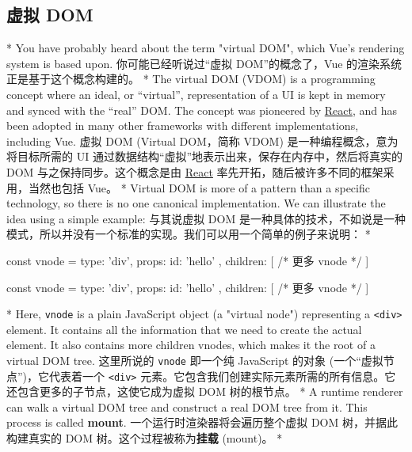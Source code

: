 \begin{paracol}{2}
\subsection{虚拟 DOM}
\switchcolumn[0]*%
You have probably heard about the term "virtual DOM", which Vue's
rendering system is based upon.
\switchcolumn
你可能已经听说过``虚拟 DOM''的概念了，Vue
的渲染系统正是基于这个概念构建的。
\switchcolumn[0]*%
The virtual DOM (VDOM) is a programming concept where an ideal, or
``virtual'', representation of a UI is kept in memory and synced with
the ``real'' DOM. The concept was pioneered by
\href{https://reactjs.org/}{React}, and has been adopted in many other
frameworks with different implementations, including Vue.
\switchcolumn
虚拟 DOM (Virtual DOM，简称 VDOM) 是一种编程概念，意为将目标所需的 UI
通过数据结构``虚拟''地表示出来，保存在内存中，然后将真实的 DOM
与之保持同步。这个概念是由 \href{https://reactjs.org/}{React}
率先开拓，随后被许多不同的框架采用，当然也包括 Vue。
\switchcolumn[0]*%
Virtual DOM is more of a pattern than a specific technology, so there is
no one canonical implementation. We can illustrate the idea using a
simple example:
\switchcolumn
与其说虚拟 DOM
是一种具体的技术，不如说是一种模式，所以并没有一个标准的实现。我们可以用一个简单的例子来说明：
\switchcolumn[0]*%
\begin{codeJs}
const vnode = {
  type: 'div',
  props: {
    id: 'hello'
  },
  children: [
    /* 更多 vnode */
  ]
}
\end{codeJs}
\switchcolumn
\begin{codeJs}
const vnode = {
  type: 'div',
  props: {
    id: 'hello'
  },
  children: [
    /* 更多 vnode */
  ]
}
\end{codeJs}
\switchcolumn[0]*%
Here, \texttt{vnode} is a plain JavaScript object (a "virtual node")
representing a \texttt{\textless{}div\textgreater{}} element. It
contains all the information that we need to create the actual element.
It also contains more children vnodes, which makes it the root of a
virtual DOM tree.
\switchcolumn
这里所说的 \texttt{vnode} 即一个纯 JavaScript 的对象
(一个``虚拟节点'')，它代表着一个 \texttt{\textless{}div\textgreater{}}
元素。它包含我们创建实际元素所需的所有信息。它还包含更多的子节点，这使它成为虚拟
DOM 树的根节点。
\switchcolumn[0]*%
A runtime renderer can walk a virtual DOM tree and construct a real DOM
tree from it. This process is called \textbf{mount}.
\switchcolumn
一个运行时渲染器将会遍历整个虚拟 DOM 树，并据此构建真实的 DOM
树。这个过程被称为\textbf{挂载} (mount)。
\switchcolumn[0]*%

\end{paracol}
